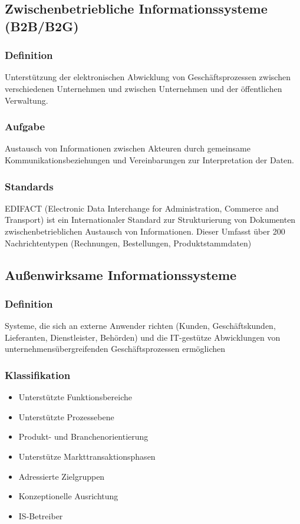 \subsection{Zwischenbetriebliche Informationssysteme (B2B/B2G)}
    \subsubsection*{Definition}
        Unterstützung der elektronischen Abwicklung von Geschäftsprozessen zwischen verschiedenen Unternehmen und zwischen Unternehmen und der öffentlichen Verwaltung.
    \subsubsection*{Aufgabe}
        Austausch von Informationen zwischen Akteuren durch gemeinsame Kommunikationsbeziehungen und Vereinbarungen zur Interpretation der Daten.
    \subsubsection*{Standards}
        EDIFACT (Electronic Data Interchange for Administration, Commerce and Transport) ist ein Internationaler Standard zur Strukturierung von Dokumenten zwischenbetrieblichen Austausch von Informationen. Dieser Umfasst über 200 Nachrichtentypen (Rechnungen, Bestellungen, Produktstammdaten)

\subsection{Außenwirksame Informationssysteme}
    \subsubsection*{Definition}
        Systeme, die sich an externe Anwender richten (Kunden, Geschäftskunden, Lieferanten, Dienstleister, Behörden) und die IT-gestütze Abwicklungen von unternehmensübergreifenden Geschäftsprozessen ermöglichen
    \subsubsection*{Klassifikation}
        \begin{itemize}
            \item Unterstützte Funktionsbereiche
            \item Unterstützte Prozessebene
            \item Produkt- und Branchenorientierung
            \item Unterstütze Markttransaktionsphasen
            \item Adressierte Zielgruppen
            \item Konzeptionelle Ausrichtung
            \item IS-Betreiber
        \end{itemize}

